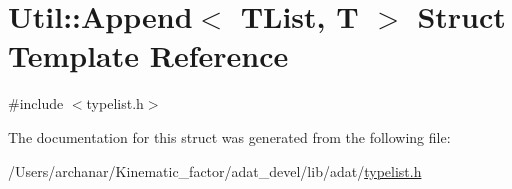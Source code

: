 \hypertarget{structUtil_1_1TL_1_1Append}{}\section{Util\+:\+:Append$<$ T\+List, T $>$ Struct Template Reference}
\label{structUtil_1_1TL_1_1Append}


{\ttfamily \#include $<$typelist.\+h$>$}



The documentation for this struct was generated from the following file\+:\begin{DoxyCompactItemize}
\item 
/\+Users/archanar/\+Kinematic\+\_\+factor/adat\+\_\+devel/lib/adat/\mbox{\hyperlink{lib_2adat_2typelist_8h}{typelist.\+h}}\end{DoxyCompactItemize}
